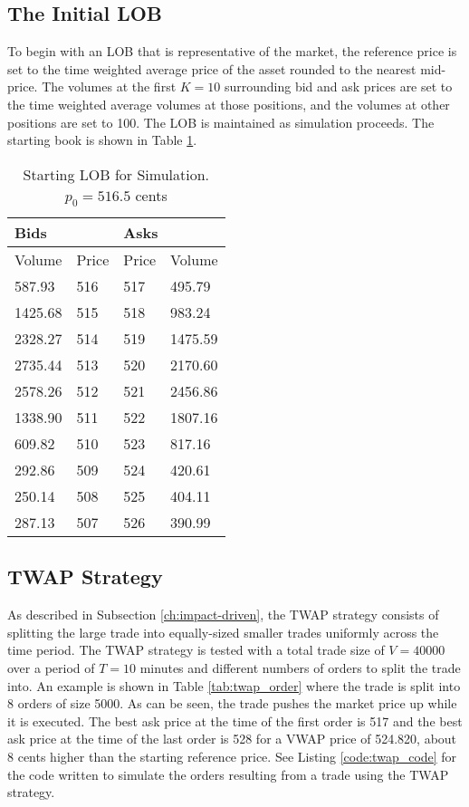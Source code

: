 \subsection{The Initial LOB}
To begin with an LOB that is representative of the market, the reference price is set to the time weighted average price of the asset rounded to the nearest mid-price. The volumes at the first $K=10$ surrounding bid and ask prices are set to the time weighted average volumes at those positions, and the volumes at other positions are set to 100. The LOB is maintained as simulation proceeds. The starting book is shown in Table \ref{tab:starting_LOB}.

\begin{table}[htbp]
\caption{Starting LOB for Simulation. $p_0 = 516.5$ cents} \label{tab:starting_LOB}
\begin{center}
\begin{tabular}{ll|ll}
\hline \hline
\multicolumn{2}{l|}{\textbf{Bids}} & \multicolumn{2}{l}{\textbf{Asks}} \\
\hline
Volume        & Price    & Price      & Volume      \\
\hline
587.93       & 516       & 517        & 495.79      \\
1425.68      & 515       & 518        & 983.24      \\
2328.27      & 514       & 519        & 1475.59     \\
2735.44      & 513       & 520        & 2170.60     \\
2578.26      & 512       & 521        & 2456.86     \\
1338.90      & 511       & 522        & 1807.16     \\
609.82       & 510       & 523        & 817.16      \\
292.86       & 509       & 524        & 420.61      \\
250.14       & 508       & 525        & 404.11      \\
287.13       & 507       & 526        & 390.99             
\end{tabular}
\end{center}
\end{table}

\subsection{TWAP Strategy}
As described in Subsection \ref{ch:impact-driven}, the TWAP strategy consists of splitting the large trade into equally-sized smaller trades uniformly across the time period. The TWAP strategy is tested with a total trade size of $V = 40000$ over a period of $T = 10$ minutes and different numbers of orders to split the trade into.  An example is shown in Table \ref{tab:twap_order} where the trade is split into 8 orders of size 5000. As can be seen, the trade pushes the market price up while it is executed. The best ask price at the time of the first order is 517 and the best ask price at the time of the last order is 528 for a VWAP price of 524.820, about 8 cents higher than the starting reference price. See Listing \ref{code:twap_code} for the code written to simulate the orders resulting from a trade using the TWAP strategy.

